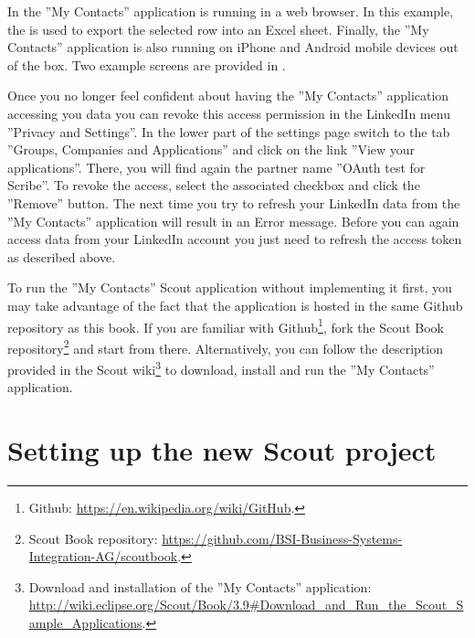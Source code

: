 \documentclass[a4paper,10pt,twoside]{book}
\begin{document}
In  the ''My Contacts'' application is running in a web browser. 
In this example, the  is used to export the selected row into an Excel sheet. 
Finally, the ''My Contacts'' application is also running on iPhone and Android mobile devices out of the box. 
Two example screens are provided in .

Once you no longer feel confident about having the ''My Contacts'' application accessing you data you can revoke this access permission in the LinkedIn menu ''Privacy and Settings''. 
In the lower part of the settings page switch to the tab ''Groups, Companies and Applications'' and click on the link ''View your applications''. 
There, you will find again the partner name ''OAuth test for Scribe''. 
To revoke the access, select the associated checkbox and click the ''Remove'' button. 
The next time you try to refresh your LinkedIn data from the ''My Contacts'' application will result in an Error message. 
Before you can again access data from your LinkedIn account you just need to refresh the access token as described above.

To run the ''My Contacts'' Scout application without implementing it first, you may take advantage of the fact that the application is hosted in the same Github repository as this book.
If you are familiar with Github\footnote{
Github: \url{https://en.wikipedia.org/wiki/GitHub}.
}, 
fork the Scout Book repository\footnote{
Scout Book repository: \url{https://github.com/BSI-Business-Systems-Integration-AG/scoutbook}.
} 
and start from there.
Alternatively, you can follow the description provided in the Scout wiki\footnote{
Download and installation of the ''My Contacts'' application: \url{http://wiki.eclipse.org/Scout/Book/3.9\#Download_and_Run_the_Scout_Sample_Applications}.
}
to download, install and run the ''My Contacts'' application.

\section{Setting up the new Scout project}
\end{document}
